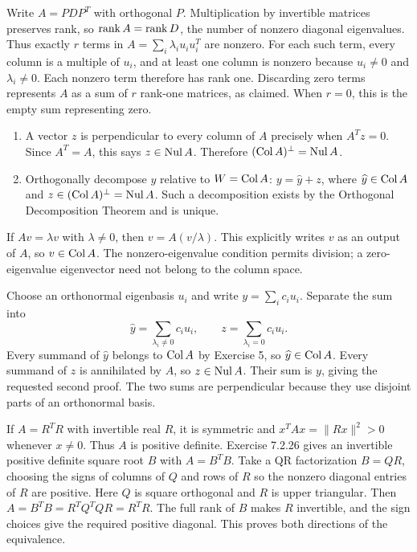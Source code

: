 Write $A=PDP^T$ with orthogonal $P$.
Multiplication by invertible matrices preserves rank, so
$\operatorname{rank} A=\operatorname{rank} D$, the number of nonzero diagonal eigenvalues.
Thus exactly $r$ terms in $A=\sum_i\lambda_i u_iu_i^T$ are nonzero.
For each such term, every column is a multiple of $u_i$, and at least
one column is nonzero because $u_i\ne0$ and $\lambda_i\ne0$.
Each nonzero term therefore has rank one. Discarding zero terms represents
$A$ as a sum of $r$ rank-one matrices, as claimed. When $r=0$, this is the
empty sum representing zero.

\begin{enumerate}[label=(\alph*)]
\item A vector $z$ is perpendicular to every column of $A$ precisely
when $A^Tz=0$. Since $A^T=A$, this says $z\in\operatorname{Nul} A$.
Therefore $(\operatorname{Col} A)^\perp=\operatorname{Nul} A$.
\item Orthogonally decompose $y$ relative to $W=\operatorname{Col} A$:
$y=\widehat y+z$, where $\widehat y\in\operatorname{Col} A$ and
$z\in(\operatorname{Col} A)^\perp=\operatorname{Nul} A$. Such a decomposition exists by the
Orthogonal Decomposition Theorem and is unique.
\end{enumerate}

If $Av=\lambda v$ with $\lambda\ne0$, then
$v=A(v/\lambda)$. This explicitly writes $v$ as an output of $A$,
so $v\in\operatorname{Col} A$. The nonzero-eigenvalue condition permits division;
a zero-eigenvalue eigenvector need not belong to the column space.

Choose an orthonormal eigenbasis $u_i$ and write $y=\sum_i c_iu_i$.
Separate the sum into
\[
 \widehat y=\sum_{\lambda_i\ne0}c_iu_i,\qquad
 z=\sum_{\lambda_i=0}c_iu_i.
\]
Every summand of $\widehat y$ belongs to $\operatorname{Col} A$ by Exercise 5,
so $\widehat y\in\operatorname{Col} A$.
Every summand of $z$ is annihilated by $A$, so $z\in\operatorname{Nul} A$.
Their sum is $y$, giving the requested second proof. The two sums are
perpendicular because they use disjoint parts of an orthonormal basis.

If $A=R^TR$ with invertible real $R$, it is symmetric and
$x^TAx=\|Rx\|^2>0$ whenever $x\ne0$. Thus $A$ is positive definite.
Exercise 7.2.26 gives an invertible positive definite square root $B$
with $A=B^TB$. Take a QR factorization $B=QR$, choosing the signs of
columns of $Q$ and rows of $R$ so the nonzero diagonal entries of $R$
are positive. Here $Q$ is square orthogonal and $R$ is upper triangular.
Then
$A=B^TB=R^TQ^TQR=R^TR$.
The full rank of $B$ makes $R$ invertible, and the sign choices give the
required positive diagonal. This proves both directions of the equivalence.

